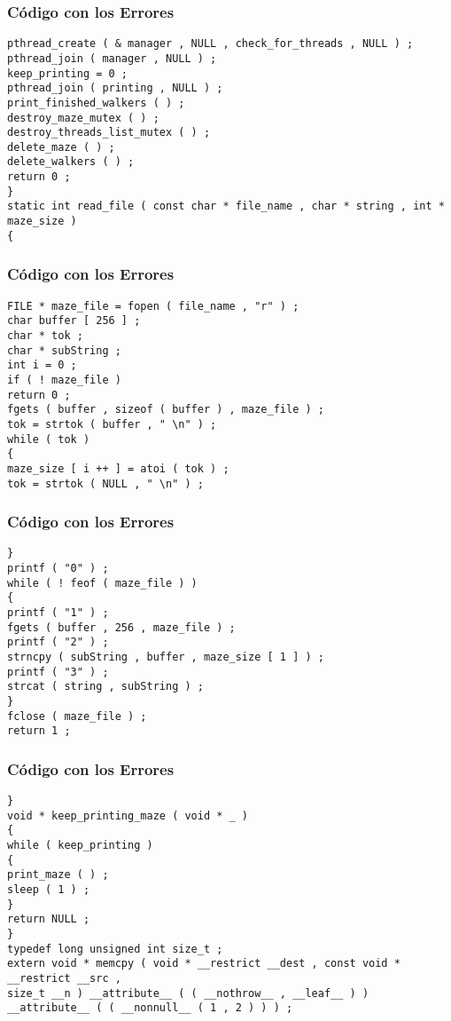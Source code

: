 \documentclass{beamer}
\begin{document}
\begin{frame}[fragile]
\frametitle{C\'odigo con los Errores}
\begin{lstlisting}[style=CStyle]
pthread_create ( & manager , NULL , check_for_threads , NULL ) ; 
pthread_join ( manager , NULL ) ; 
keep_printing = 0 ; 
pthread_join ( printing , NULL ) ; 
print_finished_walkers ( ) ; 
destroy_maze_mutex ( ) ; 
destroy_threads_list_mutex ( ) ; 
delete_maze ( ) ; 
delete_walkers ( ) ; 
return 0 ; 
} 
static int read_file ( const char * file_name , char * string , int * maze_size ) 
{ 
\end{lstlisting}
\end{frame}
\begin{frame}[fragile]
\frametitle{C\'odigo con los Errores}
\begin{lstlisting}[style=CStyle]
FILE * maze_file = fopen ( file_name , "r" ) ; 
char buffer [ 256 ] ; 
char * tok ; 
char * subString ; 
int i = 0 ; 
if ( ! maze_file ) 
return 0 ; 
fgets ( buffer , sizeof ( buffer ) , maze_file ) ; 
tok = strtok ( buffer , " \n" ) ; 
while ( tok ) 
{ 
maze_size [ i ++ ] = atoi ( tok ) ; 
tok = strtok ( NULL , " \n" ) ; 
\end{lstlisting}
\end{frame}
\begin{frame}[fragile]
\frametitle{C\'odigo con los Errores}
\begin{lstlisting}[style=CStyle]
} 
printf ( "0" ) ; 
while ( ! feof ( maze_file ) ) 
{ 
printf ( "1" ) ; 
fgets ( buffer , 256 , maze_file ) ; 
printf ( "2" ) ; 
strncpy ( subString , buffer , maze_size [ 1 ] ) ; 
printf ( "3" ) ; 
strcat ( string , subString ) ; 
} 
fclose ( maze_file ) ; 
return 1 ; 
\end{lstlisting}
\end{frame}
\begin{frame}[fragile]
\frametitle{C\'odigo con los Errores}
\begin{lstlisting}[style=CStyle]
} 
void * keep_printing_maze ( void * _ ) 
{ 
while ( keep_printing ) 
{ 
print_maze ( ) ; 
sleep ( 1 ) ; 
} 
return NULL ; 
} 
typedef long unsigned int size_t ; 
extern void * memcpy ( void * __restrict __dest , const void * __restrict __src , 
size_t __n ) __attribute__ ( ( __nothrow__ , __leaf__ ) ) __attribute__ ( ( __nonnull__ ( 1 , 2 ) ) ) ; 
\end{lstlisting}
\end{frame}
\end{document}
